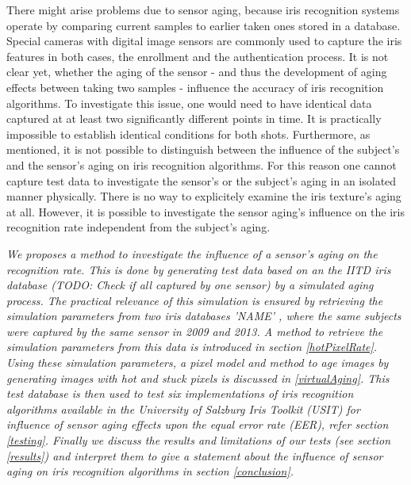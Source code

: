 \documentclass[10pt,twocolumn,letterpaper]{article}
\begin{document}
There might arise problems due to sensor aging, because iris recognition systems operate by comparing current samples to earlier taken ones stored in a database. Special cameras with digital image sensors are commonly used to capture the iris features in both cases, the enrollment and the authentication process. It is not clear yet, whether the aging of the sensor - and thus the development of aging effects between taking two samples - influence the accuracy of iris recognition algorithms. To investigate this issue, one would need to have identical data captured at at least two significantly different points in time. It is practically impossible to establish identical conditions for both shots. Furthermore, as mentioned, it is not possible to distinguish between the influence of the subject's and the sensor's aging on iris recognition algorithms. For this reason one cannot capture test data to investigate the sensor's or the subject's aging in an isolated manner physically. There is no way to explicitely examine the iris texture's aging at all. However, it is possible to investigate the sensor aging's influence on the iris recognition rate independent from the subject's aging.

\textit{
We proposes a method to investigate the influence of a sensor's aging on the recognition rate. This is done by generating test data based on an the IITD iris database \cite{iitd} (TODO: Check if all captured by one sensor) by a simulated aging process. The practical relevance of this simulation is ensured by retrieving the simulation parameters from two iris databases 'NAME' \cite{agedIris}, where the same subjects were captured by the same sensor in 2009 and 2013. A method to retrieve the simulation parameters from this data is introduced in section \ref{hotPixelRate}. Using these simulation parameters, a pixel model and method to age images by generating images with hot and stuck pixels is discussed in \ref{virtualAging}. This test database is then used to test six implementations of iris recognition algorithms available in the University of Salzburg Iris Toolkit (USIT) \cite{usit} for influence of sensor aging effects upon the equal error rate (EER), refer section \ref{testing}. Finally we discuss the results and limitations of our tests (see section \ref{results}) and interpret them to give a statement about the influence of sensor aging on iris recognition algorithms in section \ref{conclusion}.}
\end{document}

